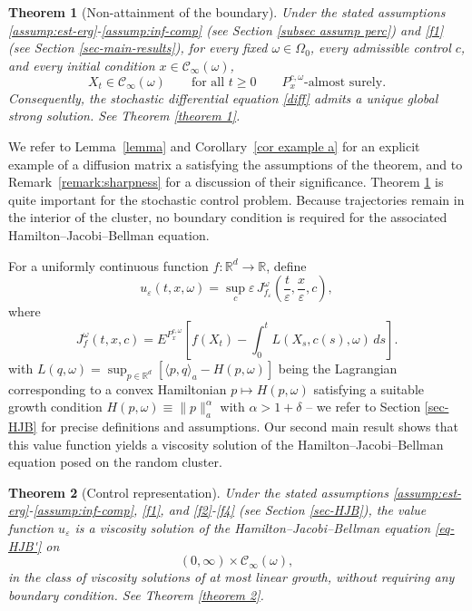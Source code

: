 \documentclass[11pt]{article}
\newcommand{\R}{\mathbb R}
\newcommand{\eps}{\varepsilon}
\newtheorem{theorem}{Theorem}[section]
\theoremstyle{rem}
\begin{document}
\begin{theorem}[Non-attainment of the boundary]\label{theorem 1'}
Under the stated assumptions \ref{assump:est-erg}-\ref{assump:inf-comp} (see Section \ref{subsec assump perc}) and \ref{f1} (see Section \ref{sec-main-results}), for every fixed $\omega\in\Omega_0$, every admissible control $c$, and every initial condition $x\in\mathcal C_\infty(\omega)$,
\[
X_t\in\mathcal C_\infty(\omega)
\qquad \text{for all } t\ge0
\qquad P_x^{c,\omega}\text{-almost surely}.
\]
Consequently, the stochastic differential equation \eqref{diff} admits a unique global strong solution. See Theorem \ref{theorem 1}.
\end{theorem}

We refer to Lemma~\ref{lemma} and Corollary~\ref{cor example a} for an explicit example of a diffusion matrix a satisfying the assumptions of the theorem, and to Remark~\ref{remark:sharpness} for a discussion of their significance. Theorem \ref{theorem 1'} is quite important for the stochastic control problem. Because trajectories remain in the interior of the cluster, no boundary condition is required for the associated Hamilton--Jacobi--Bellman equation.

For a uniformly continuous function $f:\R^d\to\R$, define
\[
u_\eps(t,x,\omega)
=
\sup_c \eps\,J^\omega_{f_\eps}
\left(\frac t\eps,\frac x\eps,c\right),
\]
where
\[
J_f^\omega(t,x,c)
=
E^{P_x^{c,\omega}}
\left[
f(X_t)-\int_0^t L(X_s,c(s),\omega)\,ds
\right].
\]
with $L(q,\omega)=\sup_{p\in\R^d}[\langle p,q\rangle_a- H(p,\omega)]$ being the Lagrangian corresponding to a convex Hamiltonian $p\mapsto H(p,\omega)$ satisfying a suitable growth condition $H(p,\omega) \equiv \|p\|_a^\alpha$ with $\alpha>1+\delta$  -- we refer to Section \ref{sec-HJB} for precise definitions and assumptions. Our second main result shows that this value function yields a viscosity solution of the Hamilton--Jacobi--Bellman equation posed on the random cluster.

\begin{theorem}[Control representation]\label{theorem 2'}
Under the stated assumptions \ref{assump:est-erg}-\ref{assump:inf-comp}, \ref{f1}, and \ref{f2}-\ref{f4} (see Section \ref{sec-HJB}), the value function $u_\eps$ is a viscosity solution of the Hamilton--Jacobi--Bellman equation \eqref{eq-HJB'} on
\[
(0,\infty)\times\mathcal C_\infty(\omega),
\]
in the class of viscosity solutions of at most linear growth, without requiring any boundary condition. See Theorem \ref{theorem 2}.
\end{theorem}
\end{document}
